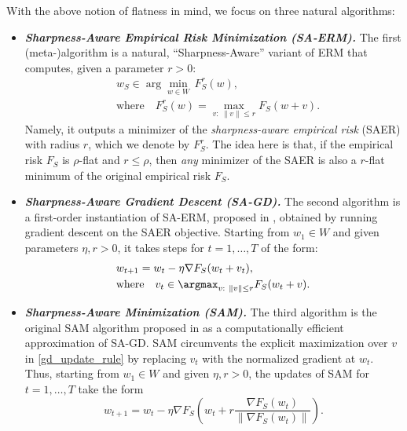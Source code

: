 \documentclass[11pt]{article}
\newcommand{\fsmax}{F_S^{\rad}}
\newcommand{\rad}{r}
\begin{document}
With the above notion of flatness in mind, we focus on three natural algorithms:

\begin{itemize}[leftmargin=*,parsep=0pt,topsep=0pt]
\item 
\emph{\bfseries Sharpness-Aware Empirical Risk Minimization (SA-ERM).}
The first (meta-)algorithm is a natural, ``Sharpness-Aware'' variant of ERM that computes, given a parameter $\rad>0$: 
\begin{equation} \label{erm_update_rule} 
\begin{alignedat}{2}
    &w_S  \in \arg\min_{w \in W} \, \fsmax(w),
    \\ &\text{where}\quad
    \fsmax(w)  = \max_{v :~ \|v\|\leq \rad} F_S(w+v).
\end{alignedat}
\end{equation}
Namely, it outputs a minimizer of the \emph{sharpness-aware empirical risk} (SAER) with radius $\rad$, which we denote by $\fsmax$. 
The idea here is that, if the empirical risk $F_S$ is $\rho$-flat and $\rad \leq \rho$, then \emph{any} minimizer of the SAER is also a $\rad$-flat minimum of the original empirical risk $F_S$.

\item 
\emph{\bfseries Sharpness-Aware Gradient Descent (SA-GD).}
The second algorithm is a first-order instantiation of SA-ERM, proposed in \citep{foret2021sharpness}, obtained by running gradient descent on the SAER objective.
Starting from $w_1 \in W$ and given parameters $\eta,\rad>0$, it takes steps for $t=1,\ldots,T$ of the form:
\begin{equation} \label{gd_update_rule} 
\begin{alignedat}{2}
     &w_{t+1}  = w_t - \eta \nabla F_S(w_t+v_t), 
    \\ &\text{where}\quad
    v_t  \in \argmax_{v :~ \|v\|\leq \rad} F_S(w_t+v).
\end{alignedat}
\end{equation}

\item 
\emph{\bfseries Sharpness-Aware Minimization (SAM).}
The third algorithm is the original SAM algorithm proposed in  \cite{foret2021sharpness} as a computationally efficient approximation of SA-GD. SAM circumvents the explicit maximization over $v$ in \cref{gd_update_rule} by replacing $v_t$ with the normalized gradient at $w_t$.
Thus, starting from $w_1 \in W$ and given $\eta,\rad>0$, the updates of SAM for $t=1,\ldots, T$ take the form
\begin{equation} \label{asc_update_rule}  
    w_{t+1} = w_t - \eta \nabla F_S\!\left(w_t + \rad \frac{\nabla F_S(w_t)}{\|\nabla F_S(w_t)\|}\right)
    .
\end{equation}

\end{itemize}
\end{document}
